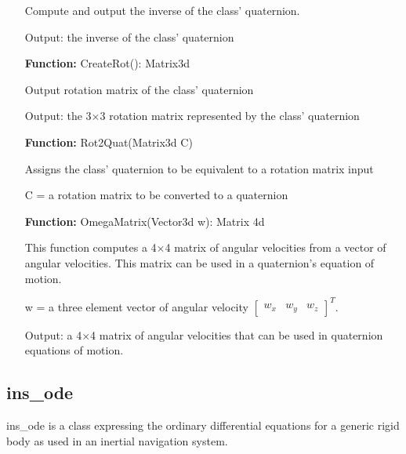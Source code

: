 \documentclass[11pt,a4paper]{article}
\begin{document}
\begin{itemize}
		Compute and output the inverse of the class' quaternion.
		
		Output: the inverse of the class' quaternion
		
		\item[\textbf{Function:}] CreateRot():  Matrix3d
		
		Output rotation matrix of the class' quaternion
		
		Output: the 3$\times$3 rotation matrix represented by the class' quaternion
		
		\item[\textbf{Function:}] Rot2Quat(Matrix3d C)
		
		Assigns the class' quaternion to be equivalent to a rotation matrix input
		
		C = a rotation matrix to be converted to a quaternion
		
		\item[\textbf{Function:}] OmegaMatrix(Vector3d w):  Matrix 4d
		
		This function computes a 4$\times$4 matrix of angular velocities from a vector of angular velocities. This matrix can be used in a quaternion's equation of motion.
		
		w = a three element vector of angular velocity $\left[\begin{array}{ccc}w_x & w_y & w_z\end{array}\right]^T$.
		
		Output: a 4$\times$4 matrix of angular velocities that can be used in quaternion equations of motion.
	\end{itemize}
	
	\subsection{ins\_ode}
	
	ins\_ode is a class expressing the ordinary differential equations for a generic rigid body as used in an inertial navigation system.
	
\end{document}
